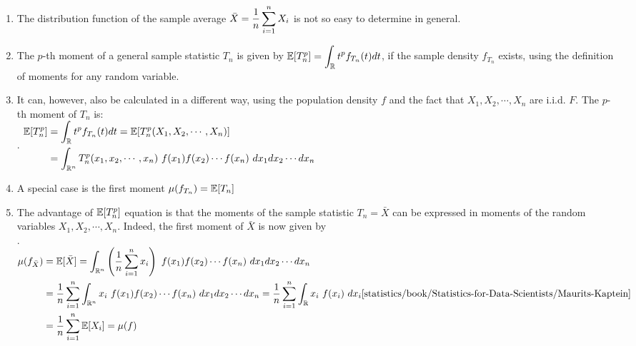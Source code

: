 \begin{enumerate}
    \item The distribution function of the sample average $\bar{X} = \dfrac{1}{n} \displaystyle\sum^n _{i=1} X _i$ is not so easy to determine in general.
    \hfill \cite{statistics/book/Statistics-for-Data-Scientists/Maurits-Kaptein}

    \item The $p$-th moment of a general sample statistic $T_n$ is given by
    $\mathbb{E}[T ^p _n] = \displaystyle\int _{\mathbb{R}} t^ p f _{T_n} (t) dt$,
    if the sample density $f _{T_n}$ exists, using the definition of moments for any random variable.
    \hfill \cite{statistics/book/Statistics-for-Data-Scientists/Maurits-Kaptein}

    \item  It can, however, also be calculated in a different way, using the population density $f$ and the fact that $X_1 , X_2, \cdots , X _n$ are i.i.d. $F$.
    The $p$-th moment of $T_n$ is:
    \hfill \cite{statistics/book/Statistics-for-Data-Scientists/Maurits-Kaptein}
    \\
    .\hfill
    $
        \begin{aligned}
            \mbbE[T ^p _n]
            &= \dint _\mbbR t ^p f_ {T_n} (t) dt
            = \mbbE[T ^p _n (X_1, X_2, \cdots , X _n )] \\
            &= \dint _{\mbbR^n} T ^p _n (x_1, x_2, \cdots , x _n )\ f (x_1) f (x_2) \cdots f (x _n ) \ dx_1dx_2 \cdots dx _n
        \end{aligned}
    $
    \hfill \cite{statistics/book/Statistics-for-Data-Scientists/Maurits-Kaptein}

    \item A special case is the first moment $\mu ( f_ {T_n} ) = \mathbb{E}[T_n]$
    \hfill \cite{statistics/book/Statistics-for-Data-Scientists/Maurits-Kaptein}

    \item The advantage of $\mathbb{E}[T ^p _n]$ equation is that the moments of the sample statistic $T_n = \bar{X}$ can be expressed in moments of the random variables $X_1 , X_2, \cdots , X _n$.
    Indeed, the first moment of $\bar{X}$ is now given by
    \hfill \cite{statistics/book/Statistics-for-Data-Scientists/Maurits-Kaptein}
    \\[0.3cm]
    .\hfill
    $
        \begin{aligned}
            \mu ( f _{\bar{X}} )
            &= \mbbE[\bar{X}]
            = \dint _{\mbbR^n} \dParenBrac{\dfrac{1}{n} \dsum ^n _{i=1} x_ i }\ f (x_1) f (x_2) \cdots f (x _n )\ dx_1dx_2 \cdots dx _n \\
            &= \dfrac{1}{n} \dsum^n _{i=1} \dint _{\mbbR^n} x _i\ f (x_1) f (x_2) \cdots f (x_ n )\ dx_1dx_2 \cdots dx _n
            = \dfrac{1}{n} \dsum^n _{i=1} \dint_ {\mbbR} x _i\ f (x _i )\ dx _i \\
            &= \dfrac{1}{n} \dsum^n _{i=1} \mbbE[X _i]
            = \mu ( f )
        \end{aligned}
        \hfill \text{\cite{statistics/book/Statistics-for-Data-Scientists/Maurits-Kaptein}}
    $


\end{enumerate}
